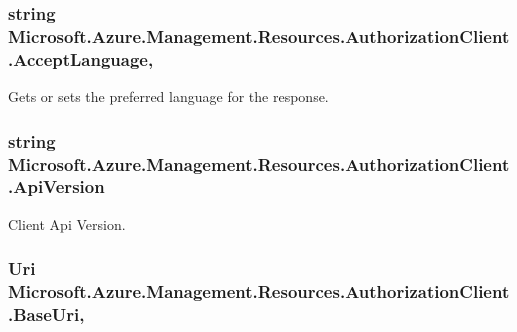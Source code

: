 \subsubsection[{\texorpdfstring{Accept\+Language}{AcceptLanguage}}]{\setlength{\rightskip}{0pt plus 5cm}string Microsoft.\+Azure.\+Management.\+Resources.\+Authorization\+Client.\+Accept\+Language\hspace{0.3cm}{\ttfamily [get]}, {\ttfamily [set]}}\hypertarget{class_microsoft_1_1_azure_1_1_management_1_1_resources_1_1_authorization_client_a3eb96839bb67595814c900aa438998a4}{}\label{class_microsoft_1_1_azure_1_1_management_1_1_resources_1_1_authorization_client_a3eb96839bb67595814c900aa438998a4}


Gets or sets the preferred language for the response. 

\subsubsection[{\texorpdfstring{Api\+Version}{ApiVersion}}]{\setlength{\rightskip}{0pt plus 5cm}string Microsoft.\+Azure.\+Management.\+Resources.\+Authorization\+Client.\+Api\+Version\hspace{0.3cm}{\ttfamily [get]}}\hypertarget{class_microsoft_1_1_azure_1_1_management_1_1_resources_1_1_authorization_client_a626224263775698e6f68e9d50abacaf6}{}\label{class_microsoft_1_1_azure_1_1_management_1_1_resources_1_1_authorization_client_a626224263775698e6f68e9d50abacaf6}


Client Api Version. 

\subsubsection[{\texorpdfstring{Base\+Uri}{BaseUri}}]{\setlength{\rightskip}{0pt plus 5cm}Uri Microsoft.\+Azure.\+Management.\+Resources.\+Authorization\+Client.\+Base\+Uri\hspace{0.3cm}{\ttfamily [get]}, {\ttfamily [set]}}\hypertarget{class_microsoft_1_1_azure_1_1_management_1_1_resources_1_1_authorization_client_a9f0833f17771ecf327c60b8b856ada57}{}\label{class_microsoft_1_1_azure_1_1_management_1_1_resources_1_1_authorization_client_a9f0833f17771ecf327c60b8b856ada57}



